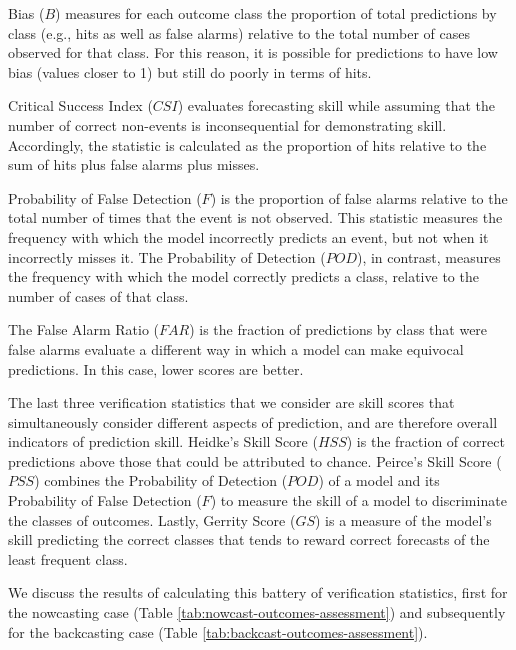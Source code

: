 \documentclass[]{elsarticle} %
\begin{document}
Bias (\(B\)) measures for each outcome class the proportion of total
predictions by class (e.g., hits as well as false alarms) relative to
the total number of cases observed for that class. For this reason, it
is possible for predictions to have low bias (values closer to 1) but
still do poorly in terms of hits.

Critical Success Index (\(CSI\)) evaluates forecasting skill while
assuming that the number of correct non-events is inconsequential for
demonstrating skill. Accordingly, the statistic is calculated as the
proportion of hits relative to the sum of hits plus false alarms plus
misses.

Probability of False Detection (\(F\)) is the proportion of false alarms
relative to the total number of times that the event is not observed.
This statistic measures the frequency with which the model incorrectly
predicts an event, but not when it incorrectly misses it. The
Probability of Detection (\(POD\)), in contrast, measures the frequency
with which the model correctly predicts a class, relative to the number
of cases of that class.

The False Alarm Ratio (\(FAR\)) is the fraction of predictions by class
that were false alarms evaluate a different way in which a model can
make equivocal predictions. In this case, lower scores are better.

The last three verification statistics that we consider are skill scores
that simultaneously consider different aspects of prediction, and are
therefore overall indicators of prediction skill. Heidke's Skill Score
(\(HSS\)) is the fraction of correct predictions above those that could
be attributed to chance. Peirce's Skill Score (\(PSS\)) combines the
Probability of Detection (\(POD\)) of a model and its Probability of
False Detection (\(F\)) to measure the skill of a model to discriminate
the classes of outcomes. Lastly, Gerrity Score (\(GS\)) is a measure of
the model's skill predicting the correct classes that tends to reward
correct forecasts of the least frequent class.

We discuss the results of calculating this battery of verification
statistics, first for the nowcasting case (Table
\ref{tab:nowcast-outcomes-assessment}) and subsequently for the
backcasting case (Table \ref{tab:backcast-outcomes-assessment}).
\end{document}
